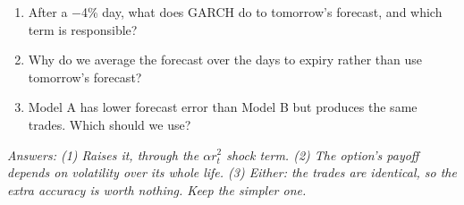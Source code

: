 \documentclass{article}
\begin{document}
\begin{enumerate}

\item After a \ensuremath{-}4\% day, what does GARCH do to tomorrow's forecast, and which term is responsible?

\item Why do we average the forecast over the days to expiry rather than use tomorrow's forecast?

\item Model A has lower forecast error than Model B but produces the same trades. Which should we use?

\end{enumerate}

\emph{Answers: (1) Raises it, through the $\alpha r_t^2$ shock term. (2) The option's payoff depends on volatility over its whole life. (3) Either: the trades are identical, so the extra accuracy is worth nothing. Keep the simpler one.}
\end{document}
